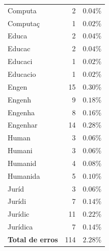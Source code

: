 \documentclass[10pt,a4paper,oneside]{article}
\begin{document}
\begin{table}[!h]
\begin{minipage}[t]{0.49\textwidth}
\begin{tabular}{l r r}
	Computa    & 2   & $0.04\%$ \\
	Computaç   & 1   & $0.02\%$ \\
	Educa      & 2   & $0.04\%$ \\
	Educac     & 2   & $0.04\%$ \\
	Educaci    & 1   & $0.02\%$ \\
	Educacio   & 1   & $0.02\%$ \\
	Engen      & 15  & $0.30\%$ \\
	Engenh     & 9   & $0.18\%$ \\
	Engenha    & 8   & $0.16\%$ \\
	Engenhar   & 14  & $0.28\%$ \\
	Human      & 3   & $0.06\%$ \\
	Humani     & 3   & $0.06\%$ \\
	Humanid    & 4   & $0.08\%$ \\
	Humanida   & 5   & $0.10\%$ \\
	Juríd      & 3   & $0.06\%$ \\
	Jurídi     & 7   & $0.14\%$ \\
	Jurídic    & 11  & $0.22\%$ \\
	Jurídica   & 7   & $0.14\%$ \\	
	\midrule
	\textbf{Total de erros}  & 114  & $2.28\%$ \\	
	\bottomrule
\end{tabular}
\end{minipage}
\end{table}
\end{document}
